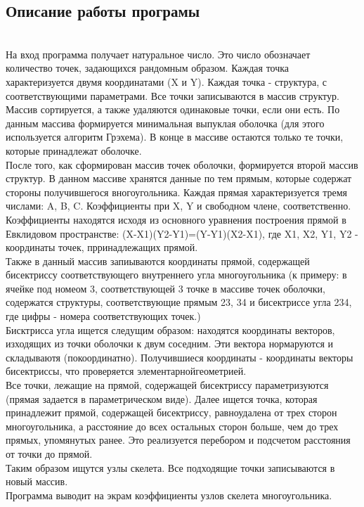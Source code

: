 \documentclass[a4paper,11pt]{article}
\begin{document}
\subsection {Описание работы програмы}
\\
На вход программа получает натуральное число. Это число обозначает количество точек, задающихся рандомным образом. Каждая точка характеризуется двумя координатами (X и Y). Каждая точка - структура, с соответствующими параметрами. Все точки записываются в массив структур. Массив сортируется, а также удаляются одинаковые точки, если они есть. По данным массива формируется минимальная выпуклая оболочка (для этого используется алгоритм Грэхема). В конце в массиве остаются только те точки, которые принадлежат оболочке.
\\
После того, как сформирован массив точек оболочки, формируется второй массив структур. В данном массиве хранятся данные по тем прямым, которые содержат стороны получившегося вногоугольника. Каждая прямая характеризуется тремя числами: A, B, C. Коэффициенты при X, Y и свободном члене, соответственно. Коэффициенты находятся исходя из основного уравнения построения прямой в Евклидовом пространстве: (X-X1)(Y2-Y1)=(Y-Y1)(X2-X1), где X1, X2, Y1, Y2 - координаты точек, прринадлежащих прямой. 
\\
Также в данный массив запиываются координаты прямой, содержащей бисектриссу соответствующего внутреннего угла многоугольника (к примеру: в ячейке под номеом 3, соответствующей 3 точке в массиве точек оболочки, содержатся структуры, соответствующие прямым 23, 34 и бисектриссе угла 234, где цифры - номера соответствующих точек.)
\\
Бисктрисса угла ищется следущим образом: находятся координаты векторов, изходящих из точки оболочки к двум соседним. Эти вектора нормаруются и складываютя (покоординатно). Получившиеся координаты - координаты векторы бисектриссы, что проверяется элементарнойгеометрией. 
\\
Все точки, лежащие на прямой, содержащей бисектриссу параметризуются (прямая задается в параметрическом виде). Далее ищется точка, которая принадлежит прямой, содержащей бисектриссу, равноудалена от трех сторон многоугольника, а расстояние до всех остальных сторон больше, чем до трех прямых, упомянутых ранее. Это реализуется перебором и подсчетом расстояния от точки до прямой.
\\
Таким образом ищутся узлы скелета. Все подходящие точки записываются в новый массив.
\\ 
Программа выводит на экрам коэффициенты узлов скелета многоугольника.
\end{document}
